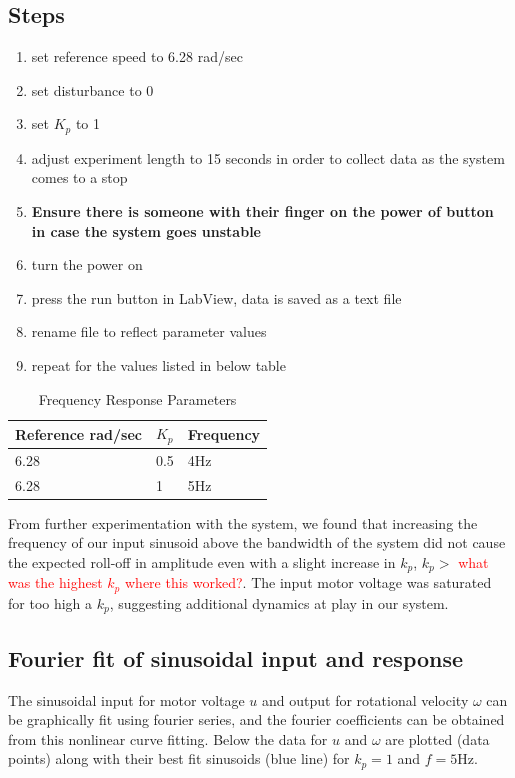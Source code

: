 \documentclass[11pt,titlepage]{article}
\begin{document}
	\subsection*{Steps}
		\begin{enumerate}
			\item set reference speed to 6.28 rad/sec
			\item set disturbance to 0
			\item set $K_p$ to 1
			\item adjust experiment length to 15 seconds in order to collect data as the system comes to a stop
			\item \textbf{Ensure there is someone with their finger on the power of button in case the system goes unstable}
			\item turn the power on
			\item press the run button in LabView, data is saved as a text file
			\item rename file to reflect parameter values
			\item repeat for the values listed in below table
		\end{enumerate}
		\begin{table}[h!]
			\centering
			\begin{tabular}{|m{4cm}|m{3cm}|m{3cm}|} 
				\hline
				Reference rad/sec & $K_p$ & Frequency \\ 
				\hline
				6.28 & 0.5 & 4Hz \\
				\hline
				6.28 & 1 & 5Hz\\
				\hline
			\end{tabular}
			\caption{Frequency Response Parameters} \label{table:freq_param}
		\end{table}
		
			From further experimentation with the system, we found that increasing the frequency of our input sinusoid above the bandwidth of the system did not cause the expected roll-off in amplitude even with a slight increase in $k_p$, $k_p >$ \textcolor{red}{what was the highest $k_p$ where this worked?}. The input motor voltage was saturated for too high a $k_p$, suggesting additional dynamics at play in our system.
		
		\subsection{Fourier fit of sinusoidal input and response}	
		The sinusoidal input for motor voltage $u$ and output for rotational velocity $\omega$ can be graphically fit using fourier series, and the fourier coefficients can be obtained from this nonlinear curve fitting. Below the data for $u$ and $\omega$ are plotted (data points) along with their best fit sinusoids (blue line) for $k_p=1$ and $f=5$Hz.
		
\end{document}
